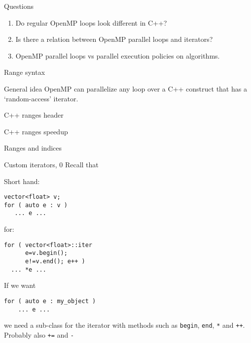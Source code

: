 
\begin{numberedframe}{Questions}
  \begin{enumerate}
  \item Do regular OpenMP loops look different in C++?
  \item Is there a relation between OpenMP parallel loops and iterators?
  \item OpenMP parallel loops vs parallel execution policies on algorithms.
  \end{enumerate}
\end{numberedframe}

\begin{numberedframe}{Range syntax}
  
\end{numberedframe}

\begin{numberedframe}{General idea}
  OpenMP can parallelize any loop over a C++ construct
  that has a `random-access' iterator.
\end{numberedframe}

\begin{numberedframe}{C++ ranges header}
  
\end{numberedframe}

\begin{numberedframe}{C++ ranges speedup}
  
\end{numberedframe}

\begin{numberedframe}{Ranges and indices}
    
\end{numberedframe}

\begin{numberedframe}{Custom iterators, 0}
  Recall that
\begin{multicols}{2}
Short hand:
\begin{lstlisting}
vector<float> v;
for ( auto e : v )
   ... e ...
\end{lstlisting}
\columnbreak for:
\begin{lstlisting}
for ( vector<float>::iter
      e=v.begin();
      e!=v.end(); e++ )
  ... *e ...
\end{lstlisting}
\end{multicols}
If we want 
\begin{lstlisting}
for ( auto e : my_object )
    ... e ...
\end{lstlisting}
we need a sub-class for the iterator with methods such as
\lstinline{begin}, \lstinline{end},
\lstinline|*| and \lstinline|++|.\\
Probably also \lstinline|+=| and \lstinline|-|
\end{numberedframe}

